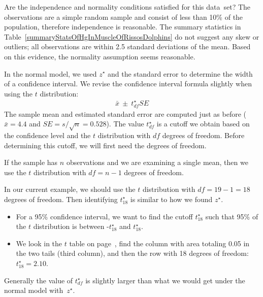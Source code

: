 \begin{example}{Are the independence and normality conditions satisfied for this data~set?}
The observations are a simple random sample and consist of less than 10\% of the population, therefore independence is reasonable. The summary statistics in Table~\ref{summaryStatsOfHgInMuscleOfRissosDolphins} do not suggest any skew or outliers; all observations are within 2.5 standard deviations of the mean. Based on this evidence, the normality assumption seems reasonable.
\end{example}

In the normal model, we used $z^{\star}$ and the standard error to determine the width of a confidence interval. We revise the confidence interval formula slightly when using the $t$ distribution:
\begin{eqnarray*}
\bar{x} \ \pm\  t^{\star}_{df}SE
\end{eqnarray*}
The sample mean and estimated standard error are computed just as before ($\bar{x} = 4.4$ and $SE = s/\sqrt{n} = 0.528$). The value $t^{\star}_{df}$ is a cutoff we obtain based on the confidence level and the $t$ distribution with $df$ degrees of freedom. Before determining this cutoff, we will first need the degrees of freedom.

\begin{termBox}{
If the sample has $n$ observations and we are examining a single mean, then we use the $t$ distribution with $df=n-1$ degrees of freedom.}
\end{termBox}

In our current example, we should use the $t$ distribution with $df=19-1=18$ degrees of freedom. Then identifying $t_{18}^{\star}$ is similar to how we found $z^{\star}$. 
\begin{itemize}
\setlength{\itemsep}{0mm}
\item For a 95\% confidence interval, we want to find the cutoff $t^{\star}_{18}$ such that 95\% of the $t$ distribution is between -$t^{\star}_{18}$ and $t^{\star}_{18}$.
\item We look in the $t$ table on page~\pageref{tTableSample}, find the column with area totaling 0.05 in the two tails (third column), and then the row with 18 degrees of freedom: $t^{\star}_{18} = 2.10$.
\end{itemize}
Generally the value of $t^{\star}_{df}$ is slightly larger than what we would get under the normal model with~$z^{\star}$.




